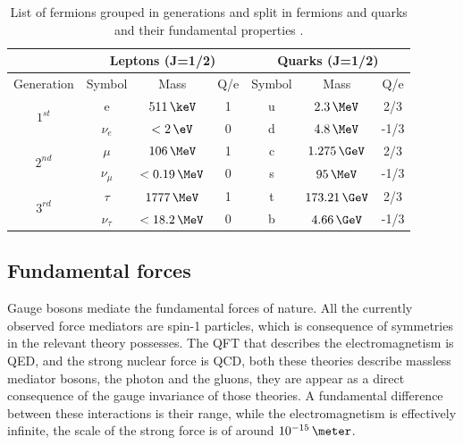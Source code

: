 \begin{table}[!htb]
\centering
\begin{tabular}{|c||c|c|c||c|c|c|}
\hline
 & \multicolumn{3}{c||}{Leptons (J=1/2)} & \multicolumn{3}{c|}{Quarks (J=1/2)} \\
\hline
Generation                &     Symbol &            Mass & Q/e & Symbol &           Mass & Q/e \\
\hline\hline
\multirow{2}{*}{$1^{st}$} & e          &     $511\,\keV$ &   1 &      u &    $2.3\,\MeV$ &  2/3 \\
                          & $\nu_e$    &     $< 2\, \eV$ &   0 &      d &    $4.8\,\MeV$ & -1/3 \\
\hline
\hline
\multirow{2}{*}{$2^{nd}$} & $\mu$      &  $   106\,\MeV$ &   1 &      c &  $1.275\,\GeV$ &  2/3 \\
                          & $\nu_\mu$  &  $< 0.19\,\MeV$ &   0 &      s &     $95\,\MeV$ & -1/3 \\
\hline
\hline
\multirow{2}{*}{$3^{rd}$} & $\tau$     & $   1777\,\MeV$ &   1 &      t & $173.21\,\GeV$ &  2/3 \\
                          & $\nu_\tau$ & $< 18.2 \,\MeV$ &   0 &      b &   $4.66\,\GeV$ & -1/3 \\
\hline
\end{tabular}
\caption[List of leptons and their fundamental properties]{List of fermions grouped in generations and split in fermions and quarks and their fundamental properties \cite{ARTICLE:PDG2014}.}
\label{TABLE:Theory_SM_ParticlesAndForces_MatterParticle}
\end{table}

\subsection{Fundamental forces}
\label{SUBSECTION:Theory_SM_FundamentalForces}


Gauge bosons mediate the fundamental forces of nature. All the currently observed force mediators are spin-1 particles, which is consequence of symmetries in the relevant theory possesses. The \gls{QFT} that describes the electromagnetism is \gls{QED}, and the strong nuclear force is \gls{QCD}, both these theories describe massless mediator bosons, the photon and the gluons, they are appear as a direct consequence of the gauge invariance of those theories. A fundamental difference between these interactions is their range, while the electromagnetism is effectively infinite, the scale of the strong force is of around $10^{-15}\,\meter$.

